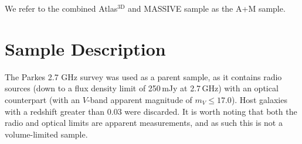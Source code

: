 \documentclass[a4paper,fleqn,usenatbib]{mnras}
\begin{document}


	We refer to the combined Atlas$^\text{3D}$ and MASSIVE sample as the A+M sample.

\section{Sample Description}
	\label{sec:samp}
	The Parkes 2.7 GHz survey \citep{Ekers1989} was used as a parent sample, as it contains radio sources (down to a flux density limit of 250\,mJy at 2.7\,GHz) with an optical counterpart (with an $V$-band apparent magnitude of $m_V \le 17.0$). Host galaxies with a redshift greater than 0.03 were discarded. It is worth noting that both the radio and optical limits are apparent measurements, and as such this is not a volume-limited sample.
\end{document}
